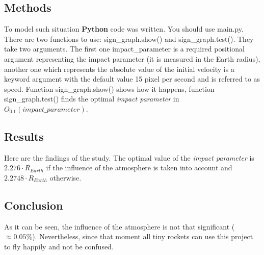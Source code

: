 \documentclass[a4paper,12pt]{article}
\begin{document}
\subsection*{Methods}
To model such situation \textbf{Python} code was written. You should use \colorbox{gray!30}{main.py}. There are two functions to use: \colorbox{gray!30}{sign\_graph.show()} and \colorbox{gray!30}{sign\_graph.test()}. They take two arguments. The first one \colorbox{gray!30}{impact\_parameter} is a required positional argument representing the impact parameter (it is measured in the Earth radius), another one which represents the absolute value of the initial velocity is a keyword argument with the default value 15 pixel per second and is referred to as \colorbox{gray!30}{speed}. Function \colorbox{gray!30}{sign\_graph.show()} shows how it happens, function \colorbox{gray!30}{sign\_graph.test()} finds the optimal \textit{impact parameter} in \textit{$O_{0.1}(impact\_parameter)$}.
\subsection*{Results}
Here are the findings of the study. The optimal value of the \textit{impact parameter} is $2.276 \cdot R_{Earth}$ if the influence of the atmosphere is taken into account and $2.2748 \cdot R_{Earth}$ otherwise.
\subsection*{Conclusion}
As it can be seen, the influence of the atmosphere is not that significant ($\approx 0.05\%$). Nevertheless, since that moment all tiny rockets can use this project to fly happily and not be confused.
\end{document}
